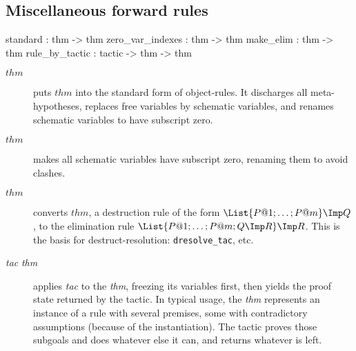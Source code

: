 \subsection{Miscellaneous forward rules}
\begin{ttbox} 
standard         : thm -> thm
zero_var_indexes : thm -> thm
make_elim        : thm -> thm
rule_by_tactic   : tactic -> thm -> thm
\end{ttbox}
\begin{description}
\item[ $thm$]  
puts $thm$ into the standard form of object-rules.  It discharges all
meta-hypotheses, replaces free variables by schematic variables, and
renames schematic variables to have subscript zero.

\item[ $thm$] 
makes all schematic variables have subscript zero, renaming them to avoid
clashes. 

\item[ $thm$] 
converts $thm$, a destruction rule of the form $\List{P@1;\ldots;P@m}\Imp
Q$, to the elimination rule $\List{P@1; \ldots; P@m; Q\Imp R}\Imp R$.  This
is the basis for destruct-resolution: {\tt dresolve_tac}, etc.

\item[ {\it tac} {\it thm}] 
  applies {\it tac\/} to the {\it thm}, freezing its variables first, then
  yields the proof state returned by the tactic.  In typical usage, the
  {\it thm\/} represents an instance of a rule with several premises, some
  with contradictory assumptions (because of the instantiation).  The
  tactic proves those subgoals and does whatever else it can, and returns
  whatever is left.
\end{description}


